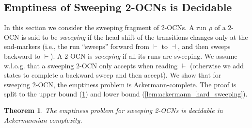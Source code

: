 \documentclass[11pt,a4paper]{amsart}
\newtheorem{theorem}{Theorem}
\theoremstyle{definition}
\newcommand{\shtodo}[1]{\todo[color=cyan!25,size=\small]{SH: #1}}
\newcommand{\lmark}{\vdash}
\newcommand{\rmark}{\dashv}
\begin{document}
\subsection{Emptiness of Sweeping 2-OCNs is Decidable}
\label{sec:sweeping} In this section we consider the sweeping fragment of
2-OCNs. A run $\rho$ of a 2-OCN is said to be \emph{sweeping} if the head shift
of the transitions changes only at the end-markers (i.e., the run ``sweeps''
forward from $\lmark$ to $\rmark$, and then sweeps backward to $\lmark$). A
2-OCN is \emph{sweeping} if all its runs are sweeping.  We assume w.l.o.g. that
a sweeping 2-OCN only accepts when reading $\lmark$ (otherwise we add states to
complete a backward sweep and then accept).
We show that for sweeping 2-OCN, the emptiness problem is Ackermann-complete. The proof is split to the upper bound (\cref{thm:Emptiness_Sweeping_decidable_ackermann}) and lower bound (\cref{lem:ackermann_hard_sweeping}).

\begin{theorem}
	\label{thm:Emptiness_Sweeping_decidable_ackermann} The emptiness problem for
	sweeping 2-OCNs is decidable in Ackermannian complexity.
\end{theorem} 
\end{document}
